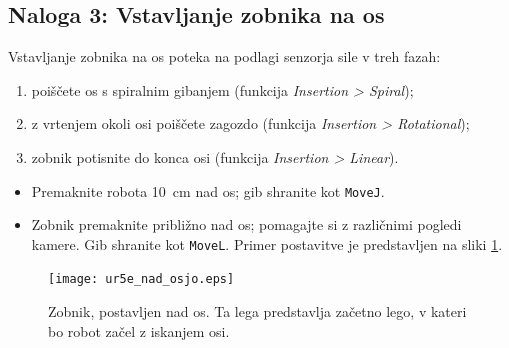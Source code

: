 \subsection{Naloga 3: Vstavljanje zobnika na os}

Vstavljanje zobnika na os poteka na podlagi senzorja sile v treh fazah:
\begin{enumerate}
  \item poiščete os s spiralnim gibanjem (funkcija \emph{Insertion > Spiral});
  \item z vrtenjem okoli osi poiščete zagozdo (funkcija \emph{Insertion > Rotational});
  \item zobnik potisnite do konca osi (funkcija \emph{Insertion > Linear}).
\end{enumerate}


\begin{mdframed}[backgroundcolor=yellow!20, shadow=true,roundcorner=8pt]
\begin{itemize}
  \item Premaknite robota 10~cm nad os; gib shranite kot \verb"MoveJ".
  \item Zobnik premaknite približno nad os; pomagajte si z različnimi pogledi kamere. Gib shranite kot \verb"MoveL". Primer postavitve je predstavljen na sliki \ref{fig:ur_nad_osjo}.
\end{itemize}
\end{mdframed}
  \begin{figure}[!hbt]
\centering
 \texttt{[image: ur5e\_nad\_osjo.eps]}
\caption{Zobnik, postavljen nad os. Ta lega predstavlja začetno lego, v kateri bo robot začel z iskanjem osi.}
\label{fig:ur_nad_osjo}
\end{figure}

